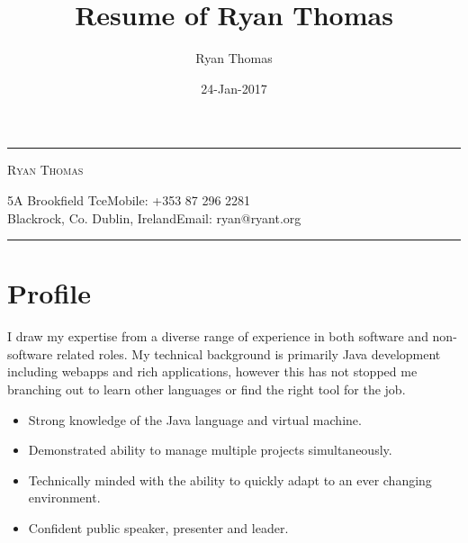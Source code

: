 \documentclass[a4paper]{article}
\author{Ryan Thomas}
\title{Resume of Ryan Thomas}
\date{24-Jan-2017}
\begin{document}
\newcommand{\ryanHeader}{
\begin{center}
\rule{14.1cm}{0.5mm}
\end{center}
\vspace{-0.6cm}
\begin{center}
\textsc{Ryan Thomas}
\end{center}
\vspace{-0.3cm}
5A Brookfield Tce\hfill Mobile: +353 87 296 2281~~\\
Blackrock, Co. Dublin, Ireland\hfill Email: ryan@ryant.org
\vspace{-0.3cm}
\begin{center}
\rule{14.1cm}{0.5mm}
\end{center}}

\newcommand{\ryanHeaderSmall}{
\begin{center}
\rule{14.1cm}{0.5mm}
\end{center}
\vspace{-0.55cm}
\begin{center}
\textsc{Ryan Thomas}
\end{center}
\vspace{-0.8cm}
\begin{center}
\rule{14.1cm}{0.5mm}
\end{center}}

\ryanHeader
\section*{Profile}
I draw my expertise from a diverse range of experience in both software and non-software related roles. My technical background is primarily Java development including webapps and rich applications, however this has not stopped me branching out to learn other languages or find the right tool for the job.
\begin{itemize}
\item Strong knowledge of the Java language and virtual machine.
\item Demonstrated ability to manage multiple projects simultaneously.
\item Technically minded with the ability to quickly adapt to an ever changing environment.
\item Confident public speaker, presenter and leader.
\end{itemize}
\end{document}

